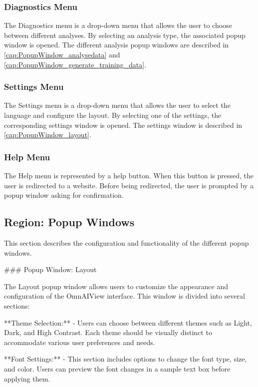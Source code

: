 \documentclass[]{scrreprt}
\begin{document}
\subsubsection{Diagnostics Menu}

The Diagnostics menu is a drop-down menu that allows the user to choose between different analyses. By selecting an analysis type, the associated popup window is opened. The different analysis popup windows are described in \ref{cap:PopupWindow_analysedata} and \ref{cap:PopupWindow_generate_training_data}.

\subsubsection{Settings Menu}

The Settings menu is a drop-down menu that allows the user to select the language and configure the layout. By selecting one of the settings, the corresponding settings window is opened. The settings window is described in \ref{cap:PopupWindow_layout}.

\subsubsection{Help Menu}

The Help menu is represented by a help button. When this button is pressed, the user is redirected to a website. Before being redirected, the user is prompted by a popup window asking for confirmation.

\subsection{Region: Popup Windows}

This section describes the configuration and functionality of the different popup windows. 

### Popup Window: Layout \label{cap:PopupWindow_layout}

The Layout popup window allows users to customize the appearance and configuration of the OmnAIView interface. This window is divided into several sections:

**Theme Selection:**
- Users can choose between different themes such as Light, Dark, and High Contrast. Each theme should be visually distinct to accommodate various user preferences and needs.

**Font Settings:**
- This section includes options to change the font type, size, and color. Users can preview the font changes in a sample text box before applying them.
\end{document}
